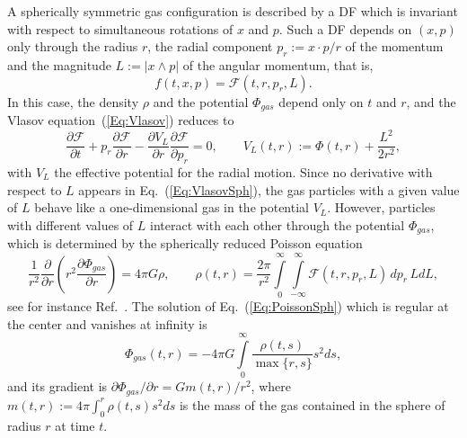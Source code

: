 A spherically symmetric gas configuration is described by a DF which is invariant with respect to simultaneous rotations of $x$ and $p$. Such a DF depends on $(x,p)$ only through the radius $r$, the radial component $p_r := x\cdot p/r$ of the momentum and the magnitude $L := |x\wedge p|$ of the angular momentum, that is,
\begin{equation}
f(t,x,p) = \mathcal{F}(t,r,p_r,L).
\label{Eq:SphSymDF}
\end{equation}
In this case, the density $\rho$ and the potential $\Phi_{gas}$ depend only on $t$ and $r$, and the Vlasov equation~(\ref{Eq:Vlasov}) reduces to
\begin{equation}
\frac{\partial \mathcal{F}}{\partial t} + p_r\frac{\partial \mathcal{F}}{\partial r} - \frac{\partial V_L}{\partial r}\frac{\partial \mathcal{F}}{\partial p_r} = 0,\qquad
V_L(t,r) := \Phi(t,r) + \frac{L^2}{2r^2},
\label{Eq:VlasovSph}
\end{equation}
with $V_L$ the effective potential for the radial motion. Since no derivative with respect to $L$ appears in Eq.~(\ref{Eq:VlasovSph}), the gas particles with a given value of $L$ behave like a one-dimensional gas in the potential $V_L$. However, particles with different values of $L$ interact with each other through the potential $\Phi_{gas}$, which is determined by the spherically reduced Poisson equation
\begin{equation}
\frac{1}{r^2}\frac{\partial}{\partial r}\left( r^2\frac{\partial\Phi_{gas}}{\partial r} \right) = 4\pi G\rho,\qquad
\rho(t,r) = \frac{2\pi}{r^2}\int\limits_0^\infty\int\limits_{-\infty}^\infty \mathcal{F}(t,r,p_r,L)\, dp_r\, L dL,
\label{Eq:PoissonSph}
\end{equation}
see for instance Ref.~\cite{pDeJmAeMdN17}. The solution of Eq.~(\ref{Eq:PoissonSph}) which is regular at the center and vanishes at infinity is
\begin{equation}
\Phi_{gas}(t,r) = -4\pi G\int\limits_0^\infty \frac{\rho(t,s)}{\max\{ r,s \}} s^2 ds,
\label{Eq:PhigasSol}
\end{equation}
and its gradient is $\partial\Phi_{gas}/\partial r = G m(t,r)/r^2$, where $m(t,r) := 4\pi\int_0^r \rho(t,s) s^2 ds$ is the mass of the gas contained in the sphere of radius $r$ at time $t$.

